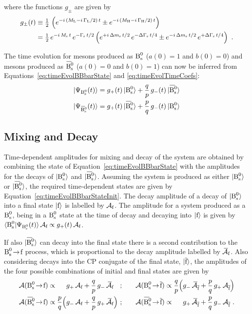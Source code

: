 where the functions $g_\pm$ are given by
\begin{align}
  \label{eq:timeEvolQp}
  g_\pm(t) &\equiv \tfrac{1}{2}\, \left( e^{-i\,(M_\text{L}-i\,\Gamma_\text{L}/2)\,t} \pm e^{-i\,(M_\text{H}-i\,\Gamma_\text{H}/2)\,t} \right) \\
           &= \tfrac{1}{2}\, e^{-i\,M_\text{s}\,t}\, e^{-\Gamma_\text{s}\,t/2}
                \left( e^{+i\,\Delta m_\text{s}\,t/2}\, e^{-\Delta\Gamma_\text{s}\,t/4} \pm e^{-i\,\Delta m_\text{s}\,t/2}\, e^{+\Delta\Gamma_\text{s}\,t/4} \right) \nonumber
           \ .
\end{align}

The time evolution for mesons produced as $\text{B}_\text{s}^\text{0}$ ($a(0)=1$ and $b(0)=0$) and mesons produced as $\Bsbar$ ($a(0)=0$ and $b(0)=1$) can now be
inferred from Equations~\ref{eq:timeEvolBBbarState} and \ref{eq:timeEvolTimeCoefs}:
\begin{subequations}
  \label{eq:timeEvolBBbarStateInit}
  \begin{align}
    |\Psi_{\Bs}(t)\rangle    = g_+(t)\,\Bsst    + \qp\,g_-(t)\,\Bsbarst \\
    |\Psi_{\Bsbar}(t)\rangle = g_+(t)\,\Bsbarst + \pq\,g_-(t)\,\Bsst
  \end{align}
\end{subequations}

\subsection{Mixing and Decay}
\label{sec:pheno_mix_decay}

Time-dependent amplitudes for mixing and decay of the \BsBsbar{} system are obtained by combining the state of
Equation~\ref{eq:timeEvolBBbarState} with the amplitudes for the decays of $|\text{B}_\text{s}^\text{0}\rangle$ and $\Bsbarst$. Assuming the system is produced as
either $|\text{B}_\text{s}^\text{0}\rangle$ or $\Bsbarst$, the required time-dependent states are given by Equation~\ref{eq:timeEvolBBbarStateInit}. The decay amplitude
of a decay of $|\text{B}_\text{s}^\text{0}\rangle$ into a final state $|\text{f}\rangle$ is labelled by $\mathcal{A}_{\text{f}}$. The amplitude for a system produced as a $\text{B}_\text{s}^\text{0}$, being in a $\text{B}_\text{s}^\text{0}$
state at the time of decay and decaying into $|\text{f}\rangle$ is given by $\langle\text{B}_\text{s}^\text{0}|\Psi_{\text{B}_\text{s}^\text{0}}(t)\rangle\,\mathcal{A}_{\text{f}} \propto g_+(t)\,\mathcal{A}_{\text{f}}$.

If also $\Bsbarst$ can decay into the final state there is a second contribution to the $\text{B}_\text{s}^\text{0}\!\to\!{\text{f}}$ process, which is proportional to the
decay amplitude labelled by $\kern 0.23em \overline{\kern -0.23em \mathcal{A}}_{\text{f}}$. Also considering decays into the CP conjugate of the final state, $|\overline{\text{f}}\rangle$, the amplitudes of the
four possible combinations of initial and final states are given by
\begin{equation}
  \label{eq:mixDecayAmps}
  \begin{alignedat}{5}
    \mathcal{A}(\Bstof) &\propto& & g_+\, \Af + \qp\, g_-\, \Abarf &&\ ; &
    \qquad
    \mathcal{A}(\Bstofbar) &\propto& \;\qp \Big( & g_-\, \Abarfbar + \pq\, g_+\, \Afbar \Big)
    \\
    \mathcal{A}(\Bsbartof) &\propto& \;\pq \Big( & g_-\, \Af + \qp\, g_+\, \Abarf \Big) &&\ ; &
    \mathcal{A}(\Bsbartofbar) &\propto& & g_+\, \Abarfbar + \pq\, g_-\, \Afbar
    \ .
  \end{alignedat}
\end{equation}

